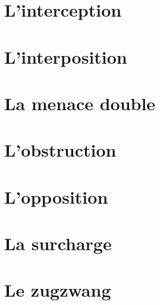 \documentclass[a5paper,openany,twocolumn]{book}
\begin{document}
{\lipsum[4]

\chapter{L'interception}
\lipsum[4]

\chapter{L'interposition}

\lipsum[4]

\chapter{La menace double}

\lipsum[4]

\chapter{L'obstruction}

\lipsum[4]

\chapter{L'opposition}

\lipsum[4]

\chapter{La surcharge}

\lipsum[4]

\chapter{Le zugzwang}

}
\end{document}
